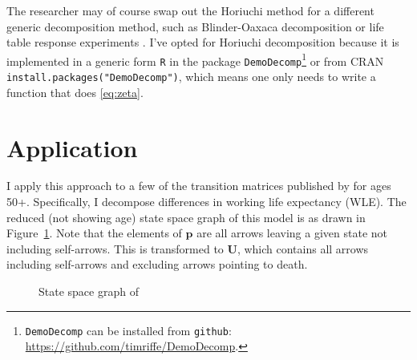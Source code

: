 \documentclass[12pt]{article}
\begin{document}
The researcher may of course swap out the Horiuchi method for a different generic decomposition method, such as Blinder-Oaxaca decomposition \citep{blinder1973wage, oaxaca1973male} or life table response experiments \citep{caswell1989analysis}. I've opted for Horiuchi decomposition because it is implemented in a generic form \texttt{R} in the package \texttt{DemoDecomp}\footnote{\texttt{DemoDecomp} can be installed from \texttt{github}: \url{https://github.com/timriffe/DemoDecomp}.} or from CRAN \texttt{install.packages("DemoDecomp")}, which means one only needs to write a function that does \eqref{eq:zeta}.

\section{Application}
I apply this approach to a few of the transition matrices published by \citet{Dudel2017} for ages 50+. Specifically, I decompose differences in working life expectancy (WLE). The reduced (not showing age) state space graph of this model is as drawn in Figure~\ref{fig:dudelstates}. Note that the elements of $\textbf{p}$ are all arrows leaving a given state not including self-arrows. This is transformed to $\textbf{U}$, which contains all arrows including self-arrows and excluding arrows pointing to death. 

\begin{figure}[ht!]
\begin{center}
\caption{State space graph of \citet{Dudel2017}}
\label{fig:dudelstates}
\end{center}
\end{figure}
\end{document}
